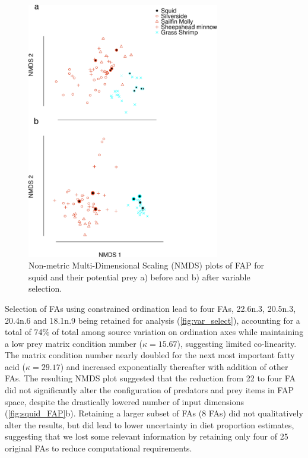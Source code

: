 \documentclass{article}%
\begin{document}
\begin{spacing}{1.9}
\begin{flushleft}
\begin{figure}
  \begin{center}
      \includegraphics[width=0.75\textwidth]{figures/2nd_NMDS_pre.pdf}
    \caption{Non-metric Multi-Dimensional Scaling (NMDS) plots of FAP
      for 
      squid and their potential prey a) before and b) after variable selection.}
    \label{fig:squid_FAP}
  \end{center}
\end{figure}

Selection of FAs using constrained ordination
lead to four FAs, 22.6n.3, 20.5n.3, 20.4n.6 and 18.1n.9 being
retained for analysis (\autoref{fig:var_select}), accounting for a
total of 74\% of total among source variation on ordination axes
while maintaining a low prey matrix condition number ($\kappa=15.67$),
suggesting limited co-linearity. The matrix condition number nearly
doubled for the next most important fatty acid ($\kappa=29.17$) and
increased exponentially thereafter with addition of other FAs. The
resulting NMDS plot suggested that the reduction from 22 to four FA did
not significantly alter the configuration of predators and prey items
in FAP space, despite the drastically lowered number of input
dimensions (\autoref{fig:squid_FAP}b). Retaining a larger subset of
FAs (8 FAs) did not qualitatively alter the results, but did lead to lower
uncertainty in diet proportion estimates, suggesting that we lost some
relevant information by retaining only four of 25 original FAs to
reduce computational requirements.


\end{flushleft}
\end{spacing}
\end{document}
